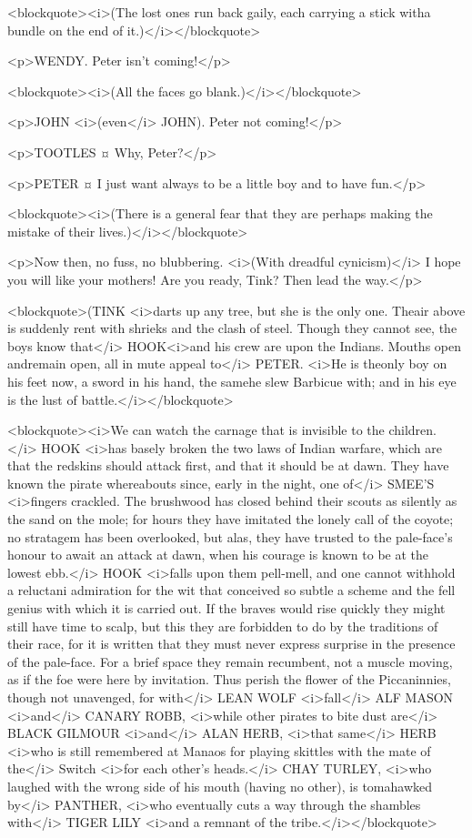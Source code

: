 <blockquote><i>(The lost ones run back gaily, each carrying a stick witha bundle on the end of it.)</i></blockquote>

<p>WENDY. Peter isn't coming!</p>

<blockquote><i>(All the faces go blank.)</i></blockquote>

<p>JOHN <i>(even</i> JOHN). Peter not coming!</p>

<p>TOOTLES ¤
Why, Peter?</p>

<p>PETER ¤
I just want always to be a little boy and to have fun.</p>

<blockquote><i>(There is a general fear that they are perhaps making the mistake of their lives.)</i></blockquote>

<p>Now then, no fuss, no blubbering. <i>(With dreadful cynicism)</i> I hope you will like your mothers! Are you ready, Tink? Then lead the way.</p>

<blockquote>(TINK <i>darts up any tree, but she is the only one. Theair above is suddenly rent with shrieks and the clash of steel. Though they cannot see, the boys know that</i> HOOK<i>and his crew are upon the Indians. Mouths open andremain open, all in mute appeal to</i> PETER. <i>He is theonly boy on his feet now, a sword in his hand, the samehe slew Barbicue with; and in his eye is the lust of battle.</i></blockquote>

<blockquote><i>We can watch the carnage that is invisible to the children.</i> HOOK <i>has basely broken the two laws of Indian warfare, which are that the redskins should attack first, and that it should be at dawn. They have known the pirate whereabouts since, early in the night, one of</i> SMEE'S <i>fingers crackled. The brushwood has closed behind their scouts as silently as the sand on the mole; for hours they have imitated the lonely call of the coyote; no stratagem has been overlooked, but alas, they have trusted to the pale-face's honour to await an attack at dawn, when his courage is known to be at the lowest ebb.</i> HOOK <i>falls upon them pell-mell, and one cannot withhold a reluctani admiration for the wit that conceived so subtle a scheme and the fell genius with which it is carried out. If the braves would rise quickly they might still have time to scalp, but this they are forbidden to do by the traditions of their race, for it is written that they must never express surprise in the presence of the pale-face. For a brief space they remain recumbent, not a muscle moving, as if the foe were here by invitation. Thus perish the flower of the Piccaninnies, though not unavenged, for with</i> LEAN WOLF <i>fall</i> ALF MASON <i>and</i> CANARY ROBB, <i>while other pirates to bite dust are</i> BLACK GILMOUR <i>and</i> ALAN HERB, <i>that same</i> HERB <i>who is still remembered at Manaos for playing skittles with the mate of the</i> Switch <i>for each other's heads.</i> CHAY TURLEY, <i>who laughed with the wrong side of his mouth (having no other), is tomahawked by</i> PANTHER, <i>who eventually cuts a way through the shambles with</i> TIGER LILY <i>and a remnant of the tribe.</i></blockquote>

